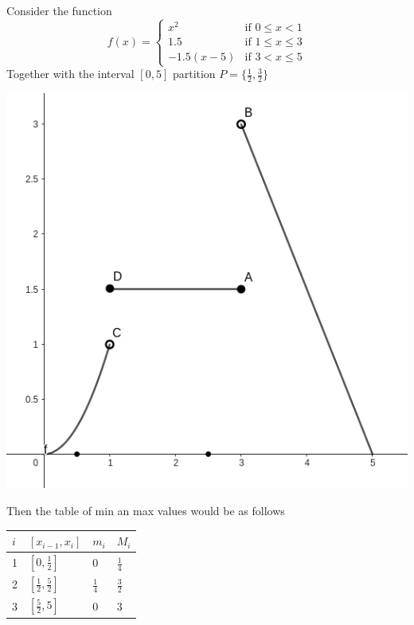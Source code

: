 \documentclass{report}
\begin{document}

    \begin{Example}
        Consider the function $$f(x) =
        \begin{cases}
        x^2 & \text{if } 0 \leq x < 1 \\
        1.5 & \text{if } 1 \leq x \leq 3 \\
        -1.5(x-5) & \text{if } 3 < x \leq 5
        \end{cases}$$
        Together with the interval $[0, 5]$ partition $P = \{\frac{1}{2}, \frac{3}{2}\}$

        \begin{center}
            \includegraphics[width=.5\textwidth]{images/minmax.png}
        \end{center}

        Then the table of min an max values would be as follows

        \begin{center}
            \begin{table}[H]
                \setlength{\extrarowheight}{20pt}
                \centering
                \begin{tabular}{l|l|l|l}
                $i$ & $[x_{i-1}, x_i]$             & $m_i$         & $M_i$         \\ \hline
                1   & $[0, \frac{1}{2}]$           & 0             & $\frac{1}{4}$ \\
                2   & $[\frac{1}{2}, \frac{5}{2}]$ & $\frac{1}{4}$ & $\frac{3}{2}$ \\
                3   & $[\frac{5}{2}, 5]$           & 0             & 3
                \end{tabular}
            \end{table}
        \end{center}

    \end{Example}
\end{document}
